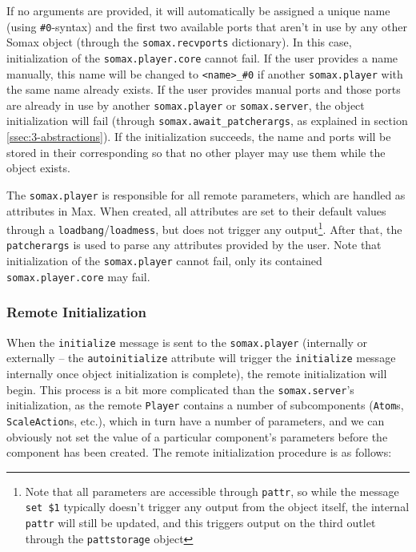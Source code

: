 If no arguments are provided, it will automatically be assigned a unique name (using \texttt{\#0}-syntax) and the first two available ports that aren't in use by any other Somax object (through the \texttt{somax.recvports} dictionary). In this case, initialization of the \texttt{somax.player.core} cannot fail. If the user provides a name manually, this name will be changed to \texttt{<name>\_\#0} if another \texttt{somax.player} with the same name already exists. If the user provides manual ports and those ports are already in use by another \texttt{somax.player} or \texttt{somax.server}, the object initialization will fail (through \texttt{somax.await\_patcherargs}, as explained in section \ref{ssec:3-abstractions}). If the initialization succeeds, the name and ports will be stored in their corresponding so that no other player may use them while the object exists.

The \texttt{somax.player} is responsible for all remote parameters, which are handled as attributes in Max. When created, all attributes are set to their default values through a \texttt{loadbang}/\texttt{loadmess}, but does not trigger any output\footnote{Note that all parameters are accessible through \texttt{pattr}, so while the message \texttt{set \$1} typically doesn't trigger any output from the object itself, the internal \texttt{pattr} will still be updated, and this triggers output on the third outlet through the \texttt{pattstorage} object}. After that, the \texttt{patcherargs} is used to parse any attributes provided by the user. Note that initialization of the \texttt{somax.player} cannot fail, only its contained \texttt{somax.player.core} may fail.


\subsubsection{Remote Initialization}
When the \texttt{initialize} message is sent to the \texttt{somax.player} (internally or externally – the \texttt{autoinitialize} attribute will trigger the \texttt{initialize} message internally once object initialization is complete), the remote initialization will begin. This process is a bit more complicated than the \texttt{somax.server}'s initialization, as the remote \texttt{Player} contains a number of subcomponents (\texttt{Atom}s, \texttt{ScaleAction}s, etc.), which in turn have a number of parameters, and we can obviously not set the value of a particular component's parameters before the component has been created. The remote initialization procedure is as follows:


